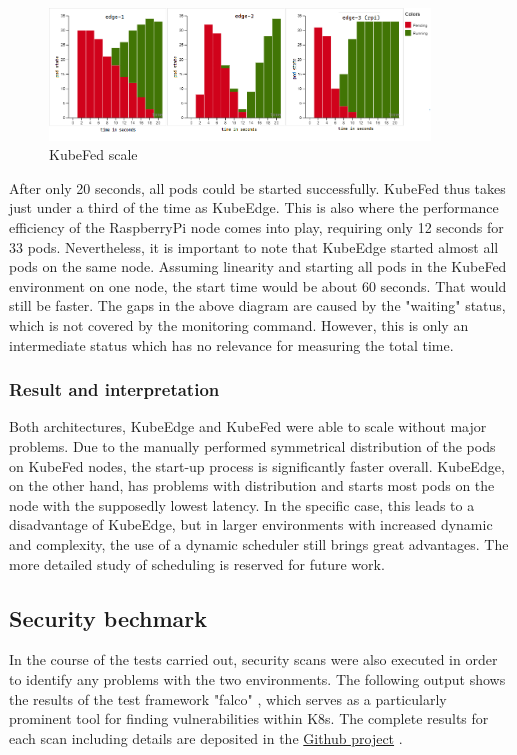 \documentclass[MIC,Master,english]{twbook}%
\begin{document}
\begin{center}
    \begin{figure}[ht]
        \centering
        \includegraphics[width=0.9\textwidth]{PICs/kubefed-scale-100.png}
        \caption{KubeFed scale}
        \label{fig:kubefed-scale}
    \end{figure}
\end{center}
\par
After only 20 seconds, all pods could be started successfully. KubeFed thus takes just under a third of the time as KubeEdge. This is also where the performance efficiency of the RaspberryPi node comes into play, requiring only 12 seconds for 33 pods. Nevertheless, it is important to note that KubeEdge started almost all pods on the same node. Assuming linearity and starting all pods in the KubeFed environment on one node, the start time would be about 60 seconds. That would still be faster. The gaps in the above diagram are caused by the "waiting" status, which is not covered by the monitoring command. However, this is only an intermediate status which has no relevance for measuring the total time.

\subsubsection{Result and interpretation} 
Both architectures, KubeEdge and KubeFed were able to scale without major problems. Due to the manually performed symmetrical distribution of the pods on KubeFed nodes, the start-up process is significantly faster overall. KubeEdge, on the other hand, has problems with distribution and starts most pods on the node with the supposedly lowest latency. In the specific case, this leads to a disadvantage of KubeEdge, but in larger environments with increased dynamic and complexity, the use of a dynamic scheduler still brings great advantages. The more detailed study of scheduling is reserved for future work.

\subsection{Security bechmark}
\label{sec:dsrusecasesec}
In the course of the tests carried out, security scans were also executed in order to identify any problems with the two environments. The following output shows the results of the test framework "falco" \cite{falco-scan}, which serves as a particularly prominent tool for finding vulnerabilities within \ac{K8s}. The complete results for each scan including details are deposited in the \hyperref{https://github.com/Berndinox/K8sEdge/tree/main/Tests/it-security}{}{}{Github project} \cite{gh-bk-ke-bench,gh-bk-kf-bench}.
\end{document}
